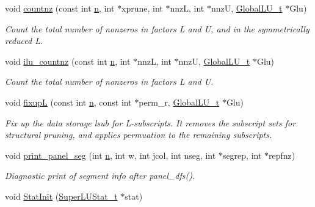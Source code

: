 \begin{DoxyCompactItemize}
void \hyperlink{scipy-0_814_80_2scipy_2sparse_2linalg_2dsolve_2SuperLU_2SRC_2util_8c_acac794ae60517b94cb755975b51b9538}{countnz} (const int \hyperlink{indexexpr_8h_ab427e2e2b4d6cec55fa088ea2a692ace}{n}, int $\ast$xprune, int $\ast$nnz\+L, int $\ast$nnz\+U, \hyperlink{structGlobalLU__t}{Global\+L\+U\+\_\+t} $\ast$Glu)
\begin{DoxyCompactList}\small\item\em Count the total number of nonzeros in factors L and U, and in the symmetrically reduced L. \end{DoxyCompactList}\item 
void \hyperlink{scipy-0_814_80_2scipy_2sparse_2linalg_2dsolve_2SuperLU_2SRC_2util_8c_a45274d2d42e1a1305101bbe11e47ed65}{ilu\+\_\+countnz} (const int \hyperlink{indexexpr_8h_ab427e2e2b4d6cec55fa088ea2a692ace}{n}, int $\ast$nnz\+L, int $\ast$nnz\+U, \hyperlink{structGlobalLU__t}{Global\+L\+U\+\_\+t} $\ast$Glu)
\begin{DoxyCompactList}\small\item\em Count the total number of nonzeros in factors L and U. \end{DoxyCompactList}\item 
void \hyperlink{scipy-0_814_80_2scipy_2sparse_2linalg_2dsolve_2SuperLU_2SRC_2util_8c_a4b97838714471334eba3f4de948d6e7a}{fixup\+L} (const int \hyperlink{indexexpr_8h_ab427e2e2b4d6cec55fa088ea2a692ace}{n}, const int $\ast$perm\+\_\+r, \hyperlink{structGlobalLU__t}{Global\+L\+U\+\_\+t} $\ast$Glu)
\begin{DoxyCompactList}\small\item\em Fix up the data storage lsub for L-\/subscripts. It removes the subscript sets for structural pruning, and applies permuation to the remaining subscripts. \end{DoxyCompactList}\item 
void \hyperlink{scipy-0_814_80_2scipy_2sparse_2linalg_2dsolve_2SuperLU_2SRC_2util_8c_a9e2ebe03503cdfc4ab20306d028ca312}{print\+\_\+panel\+\_\+seg} (int \hyperlink{indexexpr_8h_ab427e2e2b4d6cec55fa088ea2a692ace}{n}, int w, int jcol, int nseg, int $\ast$segrep, int $\ast$repfnz)
\begin{DoxyCompactList}\small\item\em Diagnostic print of segment info after panel\+\_\+dfs(). \end{DoxyCompactList}\item 
void \hyperlink{scipy-0_814_80_2scipy_2sparse_2linalg_2dsolve_2SuperLU_2SRC_2util_8c_a9b8745daf1fd22070364570977fe1ccc}{Stat\+Init} (\hyperlink{structSuperLUStat__t}{Super\+L\+U\+Stat\+\_\+t} $\ast$stat)

\end{DoxyCompactItemize}

